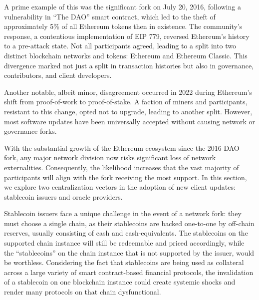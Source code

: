 \documentclass[No]{AEA}
\begin{document}
A prime example of this was the significant fork on July 20, 2016, following a vulnerability in ``The DAO'' smart contract, which led to the theft of approximately 5\% of all Ethereum tokens then in existence. The community's response, a contentious implementation of EIP 779, reversed Ethereum's history to a pre-attack state. Not all participants agreed, leading to a split into two distinct blockchain networks and tokens: Ethereum and Ethereum Classic. This divergence marked not just a split in transaction histories but also in governance, contributors, and client developers.

Another notable, albeit minor, disagreement occurred in 2022 during Ethereum's shift from proof-of-work to proof-of-stake. A faction of miners and participants, resistant to this change, opted not to upgrade, leading to another split. However, most software updates have been universally accepted without causing network or governance forks.

With the substantial growth of the Ethereum ecosystem since the 2016 DAO fork, any major network division now risks significant loss of network externalities. Consequently, the likelihood increases that the vast majority of participants will align with the fork receiving the most support. In this section, we explore two centralization vectors in the adoption of new client updates: stablecoin issuers and oracle providers.


Stablecoin issuers face a unique challenge in the event of a network fork: they must choose a single chain, as their stablecoins are backed one-to-one by off-chain reserves, usually consisting of cash and cash-equivalents. The stablecoins on the supported chain instance will still be redeemable and priced accordingly, while the ``stablecoins'' on the chain instance that is not supported by the issuer, would be worthless. Considering the fact that stablecoins are being used as collateral across a large variety of smart contract-based financial protocols, the invalidation of a stablecoin on one blockchain instance could create systemic shocks and render many protocols on that chain dysfunctional. 
\end{document}
